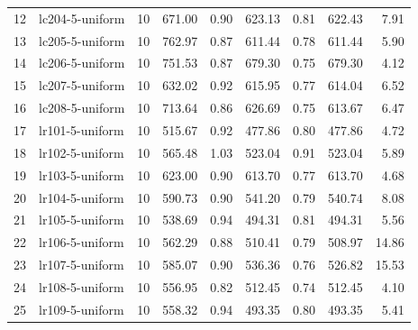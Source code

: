 \begin{tabular}{llrrrrrrr}
12 &   lc204-5-uniform &         10 &             671.00 &           0.90 &             623.13 &           0.81 &                622.43 &       7.91 \\
13 &   lc205-5-uniform &         10 &             762.97 &           0.87 &             611.44 &           0.78 &                611.44 &       5.90 \\
14 &   lc206-5-uniform &         10 &             751.53 &           0.87 &             679.30 &           0.75 &                679.30 &       4.12 \\
15 &   lc207-5-uniform &         10 &             632.02 &           0.92 &             615.95 &           0.77 &                614.04 &       6.52 \\
16 &   lc208-5-uniform &         10 &             713.64 &           0.86 &             626.69 &           0.75 &                613.67 &       6.47 \\
17 &   lr101-5-uniform &         10 &             515.67 &           0.92 &             477.86 &           0.80 &                477.86 &       4.72 \\
18 &   lr102-5-uniform &         10 &             565.48 &           1.03 &             523.04 &           0.91 &                523.04 &       5.89 \\
19 &   lr103-5-uniform &         10 &             623.00 &           0.90 &             613.70 &           0.77 &                613.70 &       4.68 \\
20 &   lr104-5-uniform &         10 &             590.73 &           0.90 &             541.20 &           0.79 &                540.74 &       8.08 \\
21 &   lr105-5-uniform &         10 &             538.69 &           0.94 &             494.31 &           0.81 &                494.31 &       5.56 \\
22 &   lr106-5-uniform &         10 &             562.29 &           0.88 &             510.41 &           0.79 &                508.97 &      14.86 \\
23 &   lr107-5-uniform &         10 &             585.07 &           0.90 &             536.36 &           0.76 &                526.82 &      15.53 \\
24 &   lr108-5-uniform &         10 &             556.95 &           0.82 &             512.45 &           0.74 &                512.45 &       4.10 \\
25 &   lr109-5-uniform &         10 &             558.32 &           0.94 &             493.35 &           0.80 &                493.35 &       5.41 \\

\end{tabular}
